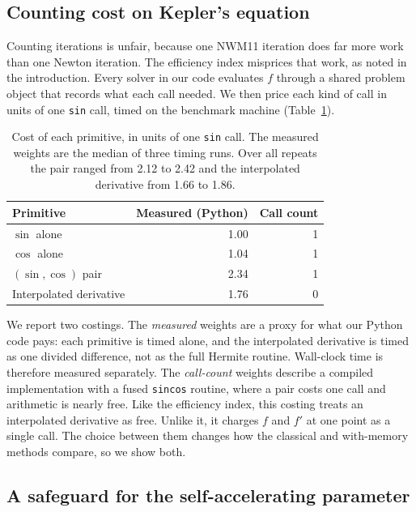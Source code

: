 \documentclass[sigconf,nonacm]{acmart}
\begin{document}
\subsection{Counting cost on Kepler's equation}
\label{sec:costmodel}

Counting iterations is unfair, because one NWM11 iteration does far more
work than one Newton iteration. The efficiency index misprices that
work, as noted in the introduction. Every solver in our code
evaluates $f$ through a shared problem object that records what each call
needed. We then price each kind of call in units of one \texttt{sin} call,
timed on the benchmark machine (Table~\ref{tab:weights}).

\begin{table}[h]
\centering\small
\caption{Cost of each primitive, in units of one \texttt{sin} call. The
measured weights are the median of three timing runs. Over all repeats
the pair ranged from 2.12 to 2.42 and the interpolated derivative from
1.66 to 1.86.}
\label{tab:weights}
\begin{tabular}{@{}lrr@{}}
\toprule
\textbf{Primitive} & \textbf{Measured (Python)} & \textbf{Call count} \\
\midrule
$\sin$ alone                  & 1.00 & 1 \\
$\cos$ alone                  & 1.04 & 1 \\
$(\sin,\cos)$ pair            & 2.34 & 1 \\
Interpolated derivative       & 1.76 & 0 \\
\bottomrule
\end{tabular}
\end{table}

We report two costings. The \emph{measured} weights are a proxy for what
our Python code pays: each primitive is timed alone, and the interpolated
derivative is timed as one divided difference, not as the full Hermite
routine. Wall-clock time is therefore measured separately. The \emph{call-count} weights describe a compiled
implementation with a fused \texttt{sincos} routine, where a pair costs
one call and arithmetic is nearly free. Like the efficiency index, this
costing treats an interpolated derivative as free. Unlike it, it charges
$f$ and $f'$ at one point as a single call. The choice between them changes how the
classical and with-memory methods compare, so we show both.

\subsection{A safeguard for the self-accelerating parameter}
\label{sec:guard}
\end{document}
